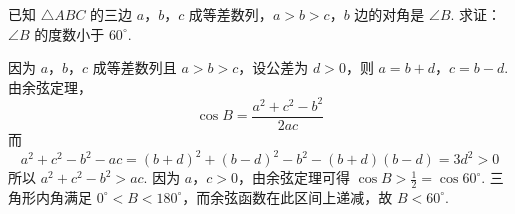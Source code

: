 \begin{problem}
已知 \(\triangle ABC\) 的三边 \(a\)，\(b\)，\(c\) 成等差数列，\(a>b>c\)，\(b\) 边的对角是 \(\angle B\). 求证：\(\angle B\) 的度数小于 \(60^\circ\).
\end{problem}

\begin{solution}
因为 \(a\)，\(b\)，\(c\) 成等差数列且 \(a>b>c\)，设公差为 \(d>0\)，则 \(a=b+d\)，\(c=b-d\). 由余弦定理，
\[
\cos B=\frac{a^2+c^2-b^2}{2ac}
\]
而
\[
a^2+c^2-b^2-ac=(b+d)^2+(b-d)^2-b^2-(b+d)(b-d)=3d^2>0
\]
所以 \(a^2+c^2-b^2>ac\). 因为 \(a\)，\(c>0\)，由余弦定理可得 \(\cos B>\frac{1}{2}=\cos60^\circ\). 三角形内角满足 \(0^\circ<B<180^\circ\)，而余弦函数在此区间上递减，故 \(B<60^\circ\).
\end{solution}
